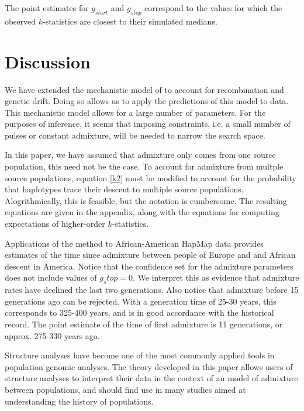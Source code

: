\documentclass[11pt]{amsart}
\begin{document}

The point estimates for $g_{start}$ and $g_{stop}$ correspond to the values for which the observed $k$-statistics are closest to their simulated medians. 
 
\section*{Discussion}

We have extended the mechanistic model of \citet{verdu2011general} to account for recombination and genetic drift. Doing so allows us to apply the predictions of this model to data. This mechanistic model allows for a large number of parameters. For the purposes of inference, it seems that imposing constraints, i.e. a small number of pulses or constant admixture, will be needed to narrow the search space.

In this paper, we have assumed that admixture only comes from one source population, this need not be the case. To account for admixture from multple source populations, equation \ref{k2} must be modified to account for the probability that haplotypes trace their descent to multiple source populations. Alogrithmically, this is feasible, but the notation is cumbersome. The resulting equations are given in the appendix, along with the equations for computing expectations of higher-order $k$-statistics.

Applications of the method to African-American HapMap data provides estimates of the time since admixture between people of Europe and and African descent in America.  Notice that the confidence set for the admixture parameters does not include values of $g_stop = 0$.  We interpret this as evidence that admixture rates have declined the last two generations.  Also notice that admixture before 15 generations ago can be rejected.  With a generation time of 25-30 years, this corresponds to 325-400 years, and is in good accordance with the historical record.  The point estimate of the time of first admixture is 11 generations, or approx. 275-330 years ago. 

Structure analyses have become one of the most commonly applied tools in population genomic analyses.  The theory developed in this paper allows users of structure analyses to interpret their data in the context of an model of admixture between populations, and should find use in many studies aimed at understanding the history of populations.
\end{document}

